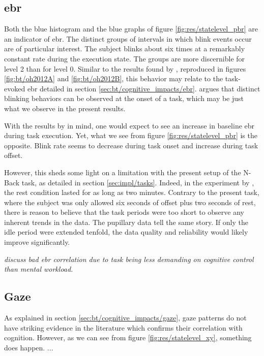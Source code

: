 % 

\subsection{\acrlong{ebr}} \label{sec:disc/ocular_correlations/ebr}

Both the blue histogram and the blue graphs of figure \ref{fig:res/statelevel_pbr} are an indicator of \acrshort{ebr}. The distinct groups of intervals in which blink events occur are of particular interest. The subject blinks about six times at a remarkably constant rate during the execution state. The groups are more discernible for level 2 than for level 0. Similar to the results found by \textcite{oh2012}, reproduced in figures \ref{fig:bt/oh2012A} and \ref{fig:bt/oh2012B}, this behavior may relate to the task-evoked \acrshort{ebr} detailed in section \ref{sec:bt/cognitive_impacts/ebr}. \textcite{oh2012} argues that distinct blinking behaviors can be observed at the onset of a task, which may be just what we observe in the present results.

With the results by \textcite{oh2012} in mind, one would expect to see an increase in baseline \acrshort{ebr} during task execution. Yet, what we see from figure \ref{fig:res/statelevel_pbr} is the opposite. Blink rate seems to decrease during task onset and increase during task offset. 

However, this sheds some light on a limitation with the present setup of the N-Back task, as detailed in section \ref{sec:impl/tasks}. Indeed, in the experiment by \textcite{oh2012}, the rest condition lasted for as long as two minutes. Contrary to the present task, where the subject was only allowed six seconds of offset plus two seconds of rest, there is reason to believe that the task periods were too short to observe any inherent trends in the data. The pupillary data tell the same story. If only the idle period were extended tenfold, the data quality and reliability would likely improve significantly.

\textit{discuss bad ebr correlation due to task being less demanding on cognitive control than mental workload.}


\subsection{Gaze}

As explained in section \ref{sec:bt/cognitive_impacts/gaze}, gaze patterns do not have striking evidence in the literature which confirms their correlation with cognition. However, as we can see from figure \ref{fig:res/statelevel_xy}, something does happen. ...




